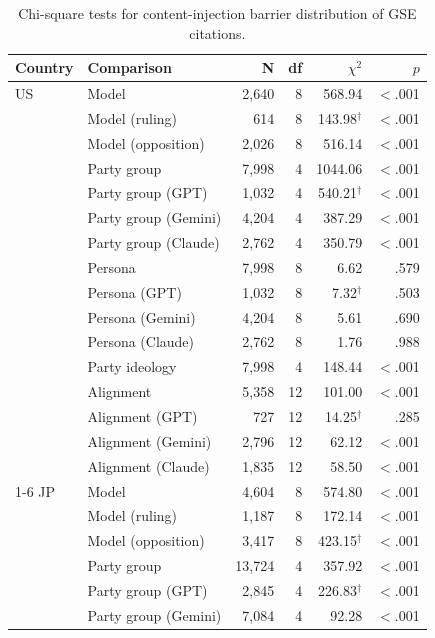 \begin{table}[t]
\centering
\footnotesize
\setlength{\tabcolsep}{3pt}
\caption{Chi-square tests for content-injection barrier distribution of GSE citations.}
\label{tab:citation-barrier-distribution-tests}
\begin{tabular}{llrrrr}
\toprule
\textbf{Country} & \textbf{Comparison} & \textbf{N} & \textbf{df} & \textbf{$\chi^2$} & \textbf{$p$} \\
\midrule
US & Model & 2{,}640 & 8 & 568.94 & $<$.001 \\
 & Model (ruling) & 614 & 8 & 143.98$^\dagger$ & $<$.001 \\
 & Model (opposition) & 2{,}026 & 8 & 516.14 & $<$.001 \\
 & Party group & 7{,}998 & 4 & 1044.06 & $<$.001 \\
 & Party group (GPT) & 1{,}032 & 4 & 540.21$^\dagger$ & $<$.001 \\
 & Party group (Gemini) & 4{,}204 & 4 & 387.29 & $<$.001 \\
 & Party group (Claude) & 2{,}762 & 4 & 350.79 & $<$.001 \\
 & Persona & 7{,}998 & 8 & 6.62 & .579 \\
 & Persona (GPT) & 1{,}032 & 8 & 7.32$^\dagger$ & .503 \\
 & Persona (Gemini) & 4{,}204 & 8 & 5.61 & .690 \\
 & Persona (Claude) & 2{,}762 & 8 & 1.76 & .988 \\
 & Party ideology & 7{,}998 & 4 & 148.44 & $<$.001 \\
 & Alignment & 5{,}358 & 12 & 101.00 & $<$.001 \\
 & Alignment (GPT) & 727 & 12 & 14.25$^\dagger$ & .285 \\
 & Alignment (Gemini) & 2{,}796 & 12 & 62.12 & $<$.001 \\
 & Alignment (Claude) & 1{,}835 & 12 & 58.50 & $<$.001 \\
\cmidrule(lr){1-6}
JP & Model & 4{,}604 & 8 & 574.80 & $<$.001 \\
 & Model (ruling) & 1{,}187 & 8 & 172.14 & $<$.001 \\
 & Model (opposition) & 3{,}417 & 8 & 423.15$^\dagger$ & $<$.001 \\
 & Party group & 13{,}724 & 4 & 357.92 & $<$.001 \\
 & Party group (GPT) & 2{,}845 & 4 & 226.83$^\dagger$ & $<$.001 \\
 & Party group (Gemini) & 7{,}084 & 4 & 92.28 & $<$.001 \\

\end{tabular}
\end{table}
